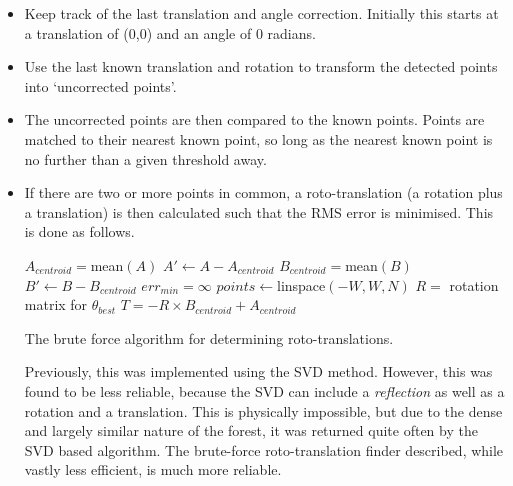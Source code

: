 \documentclass[12pt,oneside,a4paper]{book}
\begin{document}
\begin{itemize}
\item Keep track of the last translation and angle correction. Initially
  this starts at a translation of (0,0) and an angle of 0 radians.
\item Use the last known translation and rotation to transform the
  detected points into `uncorrected points'.
\item The uncorrected points are then compared to the known
  points. Points are matched to their nearest known point, so long as
  the nearest known point is no further than a given threshold away.
\item If there are two or more points in common, a roto-translation (a
  rotation plus a translation) is then calculated such that the RMS
  error is minimised. This is done as follows.

  \IncMargin{1em}
  \begin{algorithm}
    \BlankLine
    $A_{centroid} = $mean$(A)$\;
    $A' \leftarrow A - A_{centroid}$\;
    $B_{centroid} = $mean$(B)$\;
    $B' \leftarrow B - B_{centroid}$\;
    \BlankLine
    $err_{min} = \infty$ \;
    $points \leftarrow $linspace$(-W, W, N)$ \;
    \BlankLine
    \BlankLine
    $R = $ rotation matrix for $\theta_{best}$ \;
    $T = -R \times B_{centroid} + A_{centroid}$\;
    \BlankLine
    \caption{The brute force algorithm for determining roto-translations.}
  \end{algorithm}
  \newpage
  
  Previously, this was implemented using the \gls{SVD}
  method. However, this was found to be less reliable, because the SVD
  can include a \emph{reflection} as well as a rotation and a
  translation. This is physically impossible, but due to the dense and
  largely similar nature of the forest, it was returned quite often by
  the SVD based algorithm. The brute-force roto-translation finder
  described, while vastly less efficient, is much more reliable.



\end{itemize}
\end{document}
